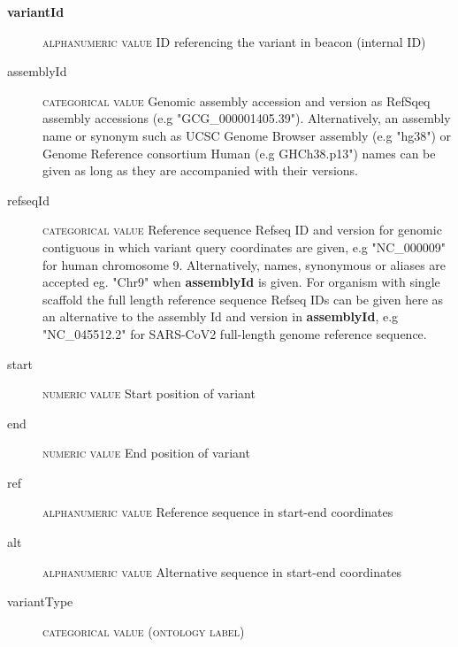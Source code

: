 \documentclass[a4paper, 10pt]{article}        %
\begin{document}
\begin{description}
	\item[\textbf{variantId}] {\textsc{alphanumeric value}} ID referencing the variant in beacon (internal ID)
	\item[assemblyId] {\textsc{categorical value}} Genomic assembly accession and version as RefSqeq assembly accessions (e.g "GCG\_000001405.39"). Alternatively, an assembly name or synonym such as UCSC Genome Browser assembly (e.g "hg38") or Genome Reference consortium Human (e.g GHCh38.p13") names can be given as long as they are accompanied with their versions. 
 	\item[refseqId] {\textsc{categorical value}} Reference sequence Refseq ID and version for genomic contiguous in which variant query coordinates are given, e.g "NC\_000009" for human chromosome 9. Alternatively, names, synonymous or aliases are accepted eg. "Chr9" when \textbf{assemblyId} is given. For organism with single scaffold the full length reference sequence Refseq IDs can be given here as an alternative to the assembly Id and version in \textbf{assemblyId}, e.g "NC\_045512.2" for SARS-CoV2 full-length genome reference sequence. 
	\item[start] {\textsc{numeric value}} Start position of variant
	\item[end] {\textsc{numeric value}} End position of variant %
	\item[ref] {\textsc{alphanumeric value}} Reference sequence in start-end coordinates
	\item[alt] {\textsc{alphanumeric value}} Alternative sequence in start-end coordinates
	\item[variantType] {\textsc{categorical value (ontology label)}}
 \end{description}
 
\end{document}
